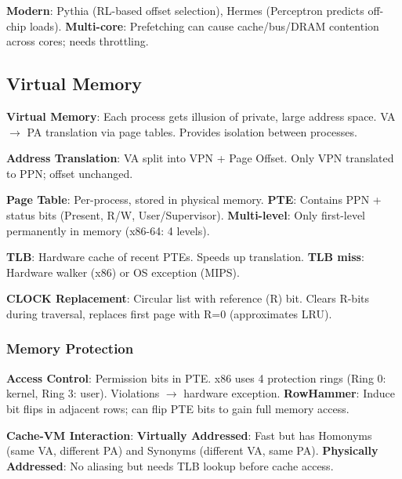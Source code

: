 \begin{remark}
	\textbf{Modern}: Pythia (RL-based offset selection), Hermes (Perceptron predicts off-chip loads).
	\textbf{Multi-core}: Prefetching can cause cache/bus/DRAM contention across cores; needs throttling.
\end{remark}

\subsection{Virtual Memory}

\begin{definition}
	\textbf{Virtual Memory}: Each process gets illusion of private, large address space. VA $\to$ PA translation via page tables. Provides isolation between processes.
\end{definition}

\begin{lemma}
	\textbf{Address Translation}: VA split into VPN + Page Offset. Only VPN translated to PPN; offset unchanged.
\end{lemma}

\begin{definition}
	\textbf{Page Table}: Per-process, stored in physical memory.
	\textbf{PTE}: Contains PPN + status bits (Present, R/W, User/Supervisor).
	\textbf{Multi-level}: Only first-level permanently in memory (x86-64: 4 levels).
\end{definition}

\begin{definition}
	\textbf{TLB}: Hardware cache of recent PTEs. Speeds up translation.
	\textbf{TLB miss}: Hardware walker (x86) or OS exception (MIPS).
\end{definition}

\begin{definition}
	\textbf{CLOCK Replacement}: Circular list with reference (R) bit. Clears R-bits during traversal, replaces first page with R=0 (approximates LRU).
\end{definition}

\subsubsection{Memory Protection}

\begin{remark}
	\textbf{Access Control}: Permission bits in PTE. x86 uses 4 protection rings (Ring 0: kernel, Ring 3: user). Violations $\to$ hardware exception.
	\textbf{RowHammer}: Induce bit flips in adjacent rows; can flip PTE bits to gain full memory access.
\end{remark}

\begin{lemma}
	\textbf{Cache-VM Interaction}:
	\textbf{Virtually Addressed}: Fast but has Homonyms (same VA, different PA) and Synonyms (different VA, same PA).
	\textbf{Physically Addressed}: No aliasing but needs TLB lookup before cache access.
\end{lemma}
